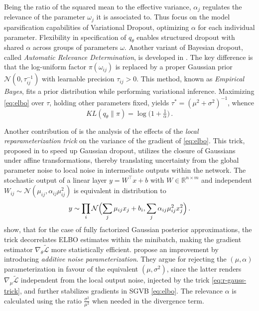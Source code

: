 \documentclass[a4paper,10pt]{article}
\begin{document}
Being the ratio of the squared mean to the effective variance, $\alpha_j$ regulates the
relevance of the parameter $\omega_j$ it is associated to. Thus \citet{molchanov_variational_2017}
focus on the model sparsification capabilities of Variational Dropout, optimizing $\alpha$
for each individual parameter. Flexibility in specification of $q_\theta$ enables structured
dropout with shared $\alpha$ across groups of parameters $\omega$. Another variant of Bayesian
dropout, called \textit{Automatic Relevance Determination}, is developed in \citep{kharitonov_variational_2018}.
The key difference is that the log-uniform factor $\pi(\omega_{ij})$ is replaced by a proper
Gaussian prior $
  \mathcal{N}(0, \tau^{-1}_{ij})
$ with learnable precision $\tau_{ij} > 0$. This method, known as \textit{Empirical Bayes},
fits a prior distribution while performing variational inference. Maximizing \eqref{eq:elbo}
over $\tau$, holding other parameters fixed, yields $
  \tau^* = {(\mu^2 + \sigma^2)}^{-1}
$, whence
\begin{equation}  \label{eq:ard-kl-div-real}
  KL(q_\theta \| \pi)
    = \log{\bigl(1 + \tfrac1{\alpha} \bigr)}
    \,.
\end{equation}

Another contribution of \citep{kingma_variational_2015} is the analysis of the effects of the
\textit{local reparameterization trick} on the variance of the gradient of \eqref{eq:elbo}.
This trick, proposed in \citep{wang_fast_2013} to speed up Gaussian dropout, utilizes the
closure of Gaussians under affine transformations, thereby translating uncertainty from the
global parameter noise to local noise in intermediate outputs within the network.
%
The stochastic output of a linear layer $
  y = W^\top x + b
$ with $
  W \in \mathbb{R}^{n\times m}
$ and independent $
  W_{ij} \sim \mathcal{N}(\mu_{ij}, \alpha_{ij} \mu_{ij}^2)
$ is equivalent in distribution to
\begin{equation}  \label{eq:r-gauss-trick}
    y \sim \prod_i \mathcal{N}\Bigl(
          \sum_j \mu_{ij} x_j + b_i,
          \sum_j \alpha_{ij} \mu_{ij}^2 x_j^2
      \Bigr)
    \,.
\end{equation}
%
\citet{kingma_variational_2015} show, that for the case of fully factorized Gaussian
posterior approximations, the trick decorrelates ELBO estimates within the minibatch,
making the gradient estimator $\nabla_\theta \tilde{\mathcal{L}}$ more statistically
efficient. \citet{molchanov_variational_2017} propose an improvement by introducing
\textit{additive noise parameterization}. They argue for rejecting the $(\mu, \alpha)$
parameterization in favour of the equivalent $(\mu, \sigma^2)$, since the latter renders $
  \nabla_\mu \tilde{\mathcal{L}}
$ independent from the local output noise, injected by the trick \eqref{eq:r-gauss-trick},
and further stabilizes gradients in SGVB \eqref{eq:elbo}. The relevance $\alpha$ is
calculated using the ratio $
  \tfrac{\sigma^2}{\mu^2}
$ when needed in the divergence term.
\end{document}

